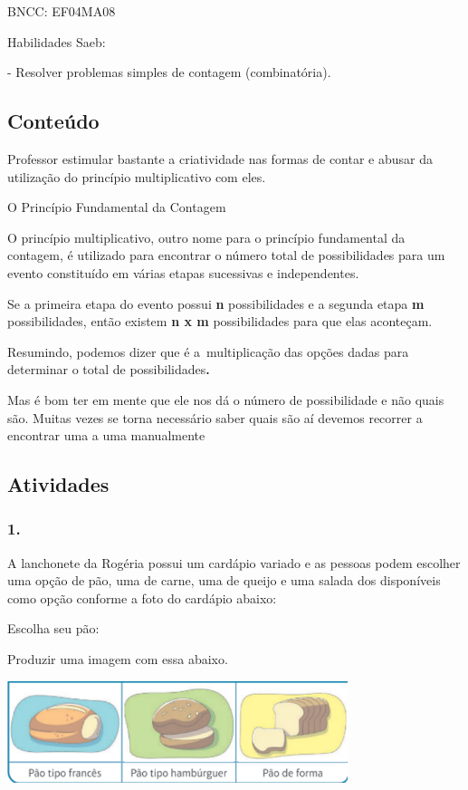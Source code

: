 BNCC: EF04MA08

Habilidades Saeb:

- Resolver problemas simples de contagem (combinatória).

\subsection{Conteúdo}\label{conteuxfado-10}

Professor estimular bastante a criatividade nas formas de contar e
abusar da utilização do princípio multiplicativo com eles.

O Princípio Fundamental da Contagem

O princípio multiplicativo, outro nome para o princípio fundamental da
contagem, é utilizado para encontrar o número total de possibilidades
para um evento constituído em várias etapas sucessivas e independentes.

Se a primeira etapa do evento possui \textbf{n} possibilidades e a
segunda etapa \textbf{m} possibilidades, então existem \textbf{n x m}
possibilidades para que elas aconteçam.

Resumindo, podemos dizer que é a~multiplicação das opções dadas para
determinar o total de possibilidades\textbf{.}

Mas é bom ter em mente que ele nos dá o número de possibilidade e não
quais são. Muitas vezes se torna necessário saber quais são aí devemos
recorrer a encontrar uma a uma manualmente

\subsection{Atividades}\label{atividades-10}

\subsubsection{1.}\label{section-130}

A lanchonete da Rogéria possui um cardápio variado e as pessoas podem
escolher uma opção de pão, uma de carne, uma de queijo e uma salada dos
disponíveis como opção conforme a foto do cardápio abaixo:

Escolha seu pão:

Produzir uma imagem com essa abaixo.

\includegraphics[width=3.91667in,height=1.17426in]{media/image134.png}

